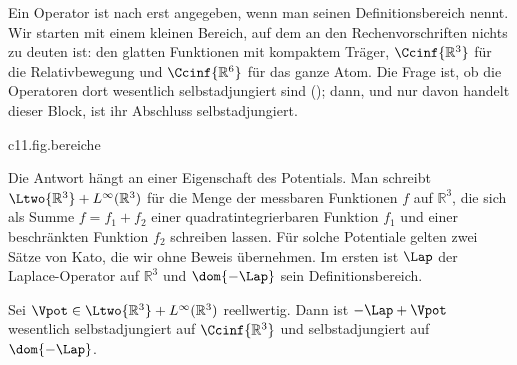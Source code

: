 \begin{fundament}[id=c11.f1,
    titel={Selbstadjungiertheit der Hamiltonoperatoren des Wasserstoffatoms},
    wozu={Im Kern sind $\HamTot$ und $\HamRel$ Rechenvorschriften für differenzierbare
      Funktionen. Hier steht, auf welchen Definitionsbereichen sie selbstadjungierte
      Operatoren festlegen, und auf welchen Satz sich das stützt.},
    voraussetzung={Kern~\ref{c11.s1} und \ref{c11.s2}; die Begriffe Definitionsbereich
      und (wesentlich) selbstadjungiert aus \defref{D16} und \defref{D19}.},
    zurueck={Die Rechenvorschriften aus \defref{D60} und
      Theorem~\ref{c11.thm.separation} legen, auf glatten Funktionen mit kompaktem
      Träger gestartet, jeweils einen selbstadjungierten Operator fest: ihren
      Abschluss.}]
  Ein Operator ist nach  erst angegeben, wenn man seinen Definitionsbereich
  nennt. Wir starten mit einem kleinen Bereich, auf dem an den Rechenvorschriften nichts
  zu deuten ist: den glatten Funktionen mit kompaktem Träger, $\Ccinf{\mathbb{R}^3}$ für
  die Relativbewegung und $\Ccinf{\mathbb{R}^6}$ für das ganze Atom. Die Frage ist, ob
  die Operatoren dort wesentlich selbstadjungiert sind (); dann, und nur
  davon handelt dieser Block, ist ihr Abschluss selbstadjungiert.

  \begin{tpcfigure}{c11.fig.bereiche}
    \caption{Die drei Funktionenmengen dieses Blocks als Schema: die glatten Funktionen mit kompaktem Träger, der Definitionsbereich $\dom{-\Lap}$ des Laplace-Operators und der ganze Raum $\Ltwo{\mathbb{R}^3}$. Eingetragen ist, was Korollar~\ref{c11.cor.relativ} über $\HamRel$ sagt.}
  \end{tpcfigure}

  Die Antwort hängt an einer Eigenschaft des Potentials. Man schreibt
  $\Ltwo{\mathbb{R}^3} + L^{\infty}(\mathbb{R}^3)$ für die Menge der messbaren Funktionen
  $f$ auf $\mathbb{R}^3$, die sich als Summe $f = f_1 + f_2$ einer quadratintegrierbaren
  Funktion $f_1$ und einer beschränkten Funktion $f_2$ schreiben lassen. Für solche
  Potentiale gelten zwei Sätze von Kato, die wir ohne Beweis übernehmen. Im ersten ist
  $\Lap$ der Laplace-Operator auf $\mathbb{R}^3$ und $\dom{-\Lap}$ sein
  Definitionsbereich.

  \begin{theorem}\label{c11.thm.kato15}
    Sei $\Vpot \in \Ltwo{\mathbb{R}^3} + L^{\infty}(\mathbb{R}^3)$ reellwertig. Dann ist
    $-\Lap + \Vpot$ wesentlich selbstadjungiert auf $\Ccinf{\mathbb{R}^3}$ und
    selbstadjungiert auf $\dom{-\Lap}$.
  \end{theorem}


\end{fundament}
